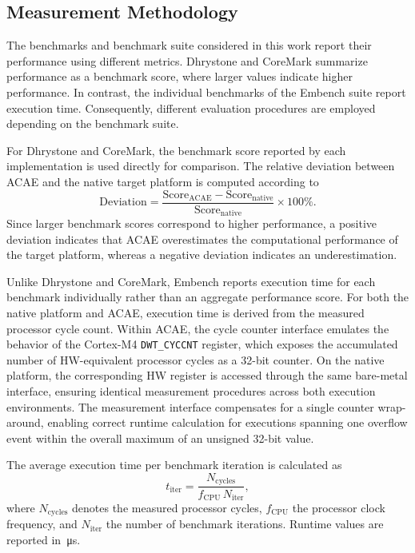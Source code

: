 \documentclass[conference]{IEEEtran}
\begin{document}
		\subsection{Measurement Methodology}
			\label{sec:meth_measurement}
			The benchmarks and benchmark suite considered in this work report their performance using different metrics.
			Dhrystone and CoreMark summarize performance as a benchmark score, where larger values indicate higher performance.
			In contrast, the individual benchmarks of the Embench suite report execution time.
			Consequently, different evaluation procedures are employed depending on the benchmark suite.
			
			For Dhrystone and CoreMark, the benchmark score reported by each implementation is used directly for comparison.
			The relative deviation between \ac{ACAE} and the native target platform is computed according to
			\begin{equation}
				\label{eq:score_deviation}
				\mathrm{Deviation} =
				\frac{\mathrm{Score}_{\mathrm{ACAE}} -
					\mathrm{Score}_{\mathrm{native}}}
					{\mathrm{Score}_{\mathrm{native}}}
				\times 100\%.
			\end{equation}
			\noindent
			Since larger benchmark scores correspond to higher performance, a positive deviation indicates that \ac{ACAE} overestimates the computational performance of the target platform, whereas a negative deviation indicates an underestimation.
			
			Unlike Dhrystone and CoreMark, Embench reports execution time for each benchmark individually rather than an aggregate performance score.
			For both the native platform and \ac{ACAE}, execution time is derived from the measured processor cycle count.
			Within \ac{ACAE}, the cycle counter interface emulates the behavior of the Cortex-M4 \texttt{DWT\_CYCCNT} register, which exposes the accumulated number of \ac{HW}-equivalent processor cycles as a 32-bit counter.
			On the native platform, the corresponding \ac{HW} register is accessed through the same bare-metal interface, ensuring identical measurement procedures across both execution environments.
			The measurement interface compensates for a single counter wrap-around, enabling correct runtime calculation for executions spanning one overflow event within the overall maximum of an unsigned 32-bit value.
			
			The average execution time per benchmark iteration is calculated as
			\begin{equation}
				\label{eq:runtime}
				t_{\mathrm{iter}} =
				\frac{N_{\mathrm{cycles}}}
					{f_{\mathrm{CPU}}\,N_{\mathrm{iter}}},
			\end{equation}
			\noindent
			where $N_{\mathrm{cycles}}$ denotes the measured processor cycles, $f_{\mathrm{CPU}}$ the processor clock frequency, and $N_{\mathrm{iter}}$ the number of benchmark iterations. Runtime values are reported in~\si{\micro\second}.
			
\end{document}
